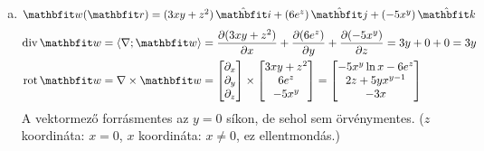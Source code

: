 \documentclass{szb-solution}
\begin{document}
\begin{enumerate}[a)]
  \item $\rvec w(\coordvec) = (3xy + z^2) \,\uvec i + (6 e^z) \,\uvec j + (-5x^y) \,\uvec k$
        \begin{align*}
          \Div \rvec w
           & = \scalar{\nabla}{\rvec w}
          = \pdv{(3xy + z^2)}{x} + \pdv{(6 e^z)}{y} + \pdv{(-5x^y)}{z}
          = 3y + 0 + 0
          = 3y
          \\
          \rot \rvec w
           & = \nabla \times \rvec w
          = \begin{bmatrix}
              \partial_x \\ \partial_y \\ \partial_z
            \end{bmatrix} \times \begin{bmatrix}
                                   3xy + z^2 \\ 6e^z \\ -5x^y
                                 \end{bmatrix} = \begin{bmatrix}
                                                   -5 x^y \ln x - 6 e^z \\
                                                   2z + 5 y x^{y-1}     \\
                                                   -3x
                                                 \end{bmatrix}
        \end{align*}
        A vektormező forrásmentes az $y = 0$ síkon, de sehol sem
        örvénymentes. ($z$ koordináta: $x = 0$, $x$ koordináta: $x \neq 0$,
        ez ellentmondás.)


\end{enumerate}
\end{document}
